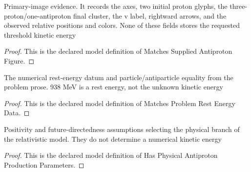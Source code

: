 \begin{definition}
  \label{def:physics:phyx-mini-0555:phyxminiproblems-problemphyxmini0555-matchessuppliedantiprotonfigure}
  Primary-image evidence. It records the axes, two initial proton glyphs, the three-proton/one-antiproton final cluster, the v label, rightward arrows, and the observed relative positions and colors. None of these fields stores the requested threshold kinetic energy
\end{definition}
\begin{proof}
  This is the declared model definition of Matches Supplied Antiproton Figure.
\end{proof}
\begin{definition}
  \label{def:physics:phyx-mini-0555:phyxminiproblems-problemphyxmini0555-matchesproblemrestenergydata}
  The numerical rest-energy datum and particle/antiparticle equality from the problem prose. 938 MeV is a rest energy, not the unknown kinetic energy
\end{definition}
\begin{proof}
  This is the declared model definition of Matches Problem Rest Energy Data.
\end{proof}
\begin{definition}
  \label{def:physics:phyx-mini-0555:phyxminiproblems-problemphyxmini0555-hasphysicalantiprotonproductionparameters}
  Positivity and future-directedness assumptions selecting the physical branch of the relativistic model. They do not determine a numerical kinetic energy
\end{definition}
\begin{proof}
  This is the declared model definition of Has Physical Antiproton Production Parameters.
\end{proof}

